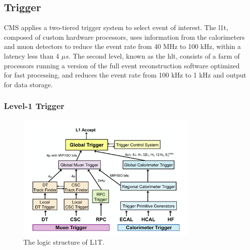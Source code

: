 \subsection{Trigger}
\label{sec:cmsexperiment:trigger}

CMS applies a two-tiered trigger system \cite{cms:trigger:Khachatryan:2016bia} to select event of interest. The \acrfull{l1t}, composed of custom hardware processors, uses information from the calorimeters and muon detectors to reduce the event rate from 40 MHz to 100 kHz, within a latency less than 4 $\mu s$. The second level, known as the \acrfull{hlt}, consists of a farm of processors running a version of the full event reconstruction software optimized for fast processing, and reduces the event rate from 100 kHz to 1 kHz and output for data storage.



\subsubsection{Level-1 Trigger}

\begin{figure}[ht]
    \centering
    \includegraphics[width=0.8\textwidth]{chapters/CMSExperiment/sectionTrigger/figures/trigger.png}
    \caption{The logic structure of L1T.}
    \label{fig:cmsexperiment:trigger:trigger}
\end{figure}

